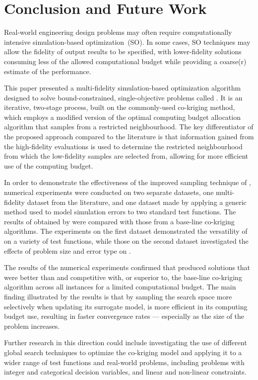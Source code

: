 \section{Conclusion and Future Work}\label{sec:conc}
Real-world engineering design problems may often require computationally intensive simulation-based optimization~(SO). In some cases, SO techniques may allow the fidelity of output results to be specified, with lower-fidelity solutions consuming less of the allowed computational budget while providing a coarse(r) estimate of the performance.

This paper presented a multi-fidelity simulation-based optimization algorithm designed to solve bound-constrained, single-objective problems called \AlgName{}. It is an iterative, two-stage process, built on the commonly-used co-kriging method, which employs a modified version of the optimal computing budget allocation algorithm that samples from a restricted neighbourhood. The key differentiator of the proposed approach compared to the literature is that information gained from the high-fidelity evaluations is used to determine the restricted neighbourhood from which the low-fidelity samples are selected from, allowing for more efficient use of the computing budget.

In order to demonstrate the effectiveness of the improved sampling technique of \AlgName{}, numerical experiments were conducted on two separate datasets, one multi-fidelity dataset from the literature, and one dataset made by applying a generic method used to model simulation errors to two standard test functions. The results of obtained by \AlgName{} were compared with those from a base-line co-kriging  \motos{} algorithms.  The experiments on the first dataset demonstrated the versatility of \AlgName{} on a variety of test functions, while those on the second dataset investigated the effects of problem size and error type on \AlgName{}.

The results of the numerical experiments confirmed that \AlgName{} produced solutions that were better than \motos{} and competitive with, or superior to, the base-line co-kriging algorithm across all instances for a limited computational budget. The main finding illustrated by the results is that by sampling the search space more selectively when updating its surrogate model, \AlgName{} is more efficient in its computing budget use, resulting in faster convergence rates --- especially as the size of the problem increases.

Further research in this direction could include investigating the use of different global search techniques to optimize the co-kriging model and applying it to a wider range of test functions and real-world problems, including problems with integer and categorical decision variables, and linear and non-linear constraints.